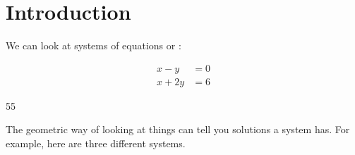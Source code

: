 \section{Introduction}

We can look at systems of equations
 or :

\noindent
\begin{minipage}{0.45\textwidth}
    \begin{center}
        \large
        \begin{align*}
            x - y &= 0 \\
            x + 2y &= 6 
        \end{align*}
    \end{center}
\end{minipage}
%
\hfil 
%
\begin{minipage}{0.45\textwidth}
    \begin{center}
        \begin{myTikzpictureGrid}{0.25} {5}{5}
            \end{myTikzpictureGrid}
    \end{center}
\end{minipage}

\noindent 
The geometric way of looking at things can tell you   solutions 
a system has. 
For example, here are three different systems.

\vfil

